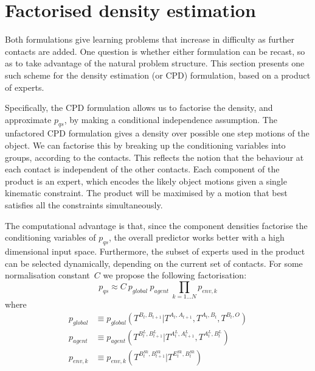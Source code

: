 

\section{Factorised density estimation}
\label{sec:Factors}

Both formulations give learning problems that increase in difficulty as further contacts are added. One question is whether either formulation can be recast, so as to take advantage of the natural
problem structure. This section presents one such scheme for the
density estimation (or CPD) formulation, based on a product of experts.

Specifically, the CPD formulation allows us to factorise the density,
and approximate $p_{qs}$, by making a conditional independence
assumption. The unfactored CPD formulation gives a density over
possible one step motions of the object. We can
factorise this by breaking up the conditioning variables into groups,
according to the contacts. This reflects the notion that the behaviour
at each contact is independent of the other contacts. Each component of the product is an expert, which encodes the likely object motions given a single kinematic constraint. The product will be maximised by a motion that best satisfies all the constraints simultaneously.

The computational advantage is that, since the component
densities factorise the conditioning variables of $p_{qs}$, the overall predictor works better with a high dimensional input space.  Furthermore, the subset of experts used in the product can be selected dynamically, depending on the current set of contacts. For some normalisation constant~$C$ we propose the following factorisation:
\begin{equation}
p_{qs} \approx C\ p_{global}\ p_{agent}\ \mathop{\prod}_{k=1 \ldots N}{ p_{env,k}}
\label{eq:Learning.product}
\end{equation}
\noindent where
\begin{subequations}
\begin{align}
p_{global} &\equiv p_{global}(T^{B_{t}, B_{t+1}}|T^{A_{t}, A_{t+1}}, T^{A_t, B_t}, T^{B_t, O})
\label{eq:Learning.densityglobal} \\
p_{agent} &\equiv p_{agent}(T^{B^{L}_{t}, B^{L}_{t+1}}|T^{A^{L}_{t}, A^{L}_{t+1}}, T^{A^{L}_t, B^{L}_t})
\label{eq:Learning.densitylocal} \\
p_{env,k} &\equiv p_{env,k}(T^{B^{Sk}_t, B^{Sk}_{t+1}} | T^{E^{Sk}_t,B^{Sk}_t})
\label{eq:Learning.densityenv}
\end{align}
\end{subequations}

